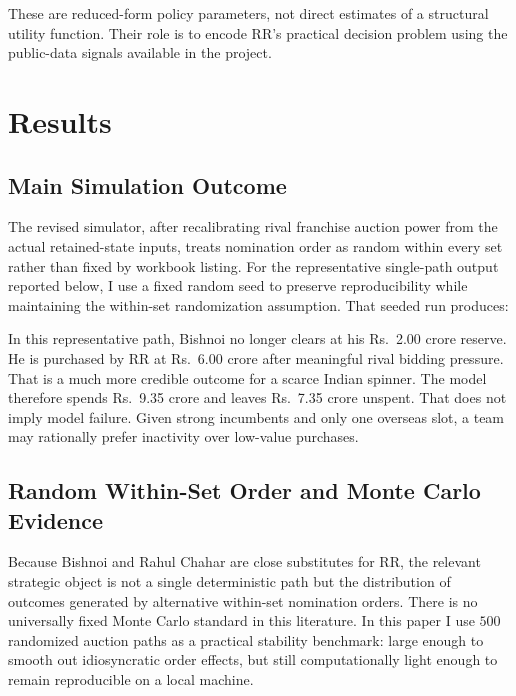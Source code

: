 \documentclass[11pt]{article}
\begin{document}
These are reduced-form policy parameters, not direct estimates of a structural utility function. Their role is to encode RR's practical decision problem using the public-data signals available in the project.

\section{Results}

\subsection{Main Simulation Outcome}

The revised simulator, after recalibrating rival franchise auction power from the actual retained-state inputs, treats nomination order as random within every set rather than fixed by workbook listing. For the representative single-path output reported below, I use a fixed random seed to preserve reproducibility while maintaining the within-set randomization assumption. That seeded run produces:



In this representative path, Bishnoi no longer clears at his Rs.\ 2.00 crore reserve. He is purchased by RR at Rs.\ 6.00 crore after meaningful rival bidding pressure. That is a much more credible outcome for a scarce Indian spinner. The model therefore spends Rs.\ 9.35 crore and leaves Rs.\ 7.35 crore unspent. That does not imply model failure. Given strong incumbents and only one overseas slot, a team may rationally prefer inactivity over low-value purchases.

\subsection{Random Within-Set Order and Monte Carlo Evidence}

Because Bishnoi and Rahul Chahar are close substitutes for RR, the relevant strategic object is not a single deterministic path but the distribution of outcomes generated by alternative within-set nomination orders. There is no universally fixed Monte Carlo standard in this literature. In this paper I use \(500\) randomized auction paths as a practical stability benchmark: large enough to smooth out idiosyncratic order effects, but still computationally light enough to remain reproducible on a local machine.


\end{document}
